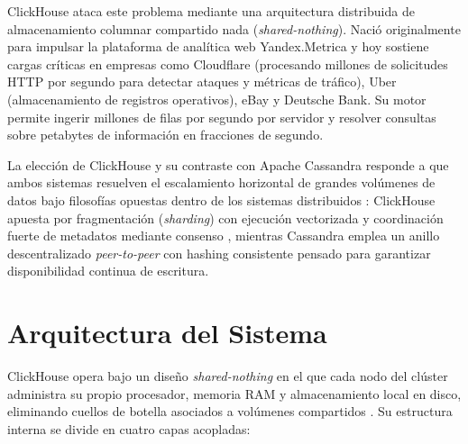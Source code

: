 \documentclass[12pt,a4paper]{article}
\begin{document}
ClickHouse ataca este problema mediante una arquitectura distribuida de almacenamiento columnar compartido nada (\textit{shared-nothing}). Nació originalmente para impulsar la plataforma de analítica web Yandex.Metrica y hoy sostiene cargas críticas en empresas como Cloudflare (procesando millones de solicitudes HTTP por segundo para detectar ataques y métricas de tráfico), Uber (almacenamiento de registros operativos), eBay y Deutsche Bank. Su motor permite ingerir millones de filas por segundo por servidor y resolver consultas sobre petabytes de información en fracciones de segundo.

La elección de ClickHouse y su contraste con Apache Cassandra responde a que ambos sistemas resuelven el escalamiento horizontal de grandes volúmenes de datos bajo filosofías opuestas dentro de los sistemas distribuidos \cite{vansteen2023distributed}: ClickHouse apuesta por fragmentación (\textit{sharding}) con ejecución vectorizada y coordinación fuerte de metadatos mediante consenso \cite{han2024palf}, mientras Cassandra emplea un anillo descentralizado \textit{peer-to-peer} con hashing consistente pensado para garantizar disponibilidad continua de escritura.

\section{Arquitectura del Sistema}
ClickHouse opera bajo un diseño \textit{shared-nothing} en el que cada nodo del clúster administra su propio procesador, memoria RAM y almacenamiento local en disco, eliminando cuellos de botella asociados a volúmenes compartidos \cite{vansteen2023distributed, habib2024architecture}. Su estructura interna se divide en cuatro capas acopladas:
\end{document}
